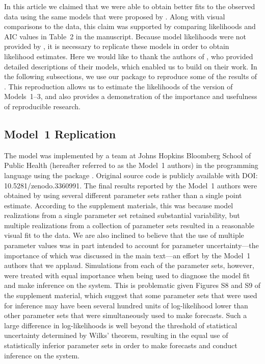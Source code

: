 In this article we claimed that we were able to obtain better fits to the observed data using the same models that were proposed by \citet{lee20}.
Along with visual comparisons to the data, this claim was supported by comparing likelihoods and AIC values in Table~2 in the manuscript.
Because model likelihoods were not provided by \citet{lee20}, it is necessary to replicate these models in order to obtain likelihood estimates.
Here we would like to thank the authors of \citet{lee20}, who provided detailed descriptions of their models, which enabled us to build on their work.
In the following subsections, we use our  package  to reproduce some of the results of \citet{lee20}.
This reproduction allows us to estimate the likelihoods of the \citet{lee20} version of Models~1--3, and also provides a demonstration of the importance and usefulness of reproducible research.

\subsection{Model~1 Replication}

The model was implemented by a team at Johns Hopkins Bloomberg School of Public Health (hereafter referred to as the Model~1 authors) in the  programming language using the  package \citep{king16}.
Original source code is publicly available with DOI: 10.5281/zenodo.3360991.
The final results reported by the Model~1 authors were obtained by using several different parameter sets rather than a single point estimate.
According to the supplement materials, this was because model realizations from a single parameter set retained substantial variability, but multiple realizations from a collection of parameter sets resulted in a reasonable visual fit to the data.
We are also inclined to believe that the use of multiple parameter values was in part intended to account for parameter uncertainty---the importance of which was discussed in the main text---an effort by the Model~1 authors that we applaud.
Simulations from each of the parameter sets, however, were treated with equal importance when being used to diagnose the model fit and make inference on the system.
This is problematic given Figures S8 and S9 of the supplement material, which suggest that some parameter sets that were used for inference may have been several hundred units of log-likelihood lower than other parameter sets that were simultaneously used to make forecasts.
Such a large difference in log-likelihoods is well beyond the threshold of statistical uncertainty determined by Wilks' theorem, resulting in the equal use of statistically inferior parameter sets in order to make forecasts and conduct inference on the system.

